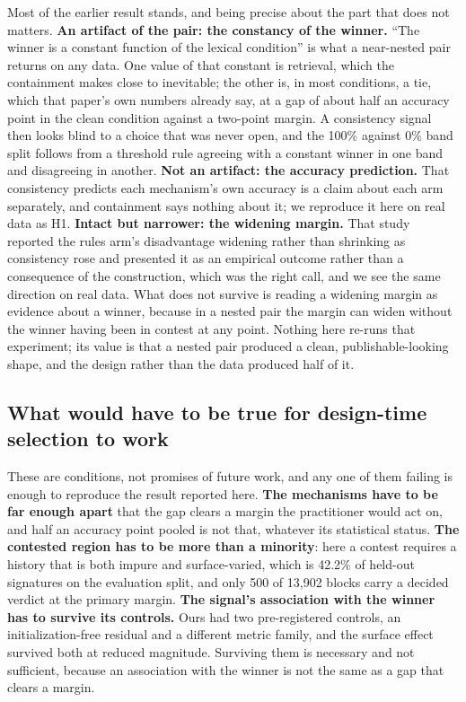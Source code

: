 \documentclass[11pt]{article}
\begin{document}
Most of the earlier result stands, and being precise about the part that does
not matters. \textbf{An artifact of the pair: the constancy of the winner.}
``The winner is a constant function of the lexical condition'' is what a
near-nested pair returns on any data. One value of that constant is
retrieval, which the containment makes close to inevitable; the other is, in
most conditions, a tie, which that paper's own numbers already say, at a gap of about half an
accuracy point in the clean condition against a two-point margin. A
consistency signal then looks blind to a choice that was never open, and the
100\% against 0\% band split follows from a threshold rule agreeing with a
constant winner in one band and disagreeing in another.
\textbf{Not an artifact: the accuracy prediction.} That consistency predicts
each mechanism's own accuracy is a claim about each arm separately, and
containment says nothing about it; we reproduce it here on real data as H1.
\textbf{Intact but narrower: the widening margin.} That study reported the
rules arm's disadvantage widening rather than shrinking as consistency rose
and presented it as an empirical outcome rather than a consequence of the
construction, which was the right call, and we see the same direction on real
data. What does not survive is reading a widening margin as evidence about a
winner, because in a nested pair the margin can widen without the winner
having been in contest at any point. Nothing here re-runs that experiment; its
value is that a nested pair produced a clean, publishable-looking shape, and
the design rather than the data produced half of it.

\subsection{What would have to be true for design-time selection to work}
\label{sec:conditions}

These are conditions, not promises of future work, and any one of them failing
is enough to reproduce the result reported here. \textbf{The mechanisms have
to be far enough apart} that the gap clears a margin the practitioner would
act on, and half an accuracy point pooled is not that, whatever its
statistical status. \textbf{The contested region has to be more than a
minority}: here a contest requires a history that is both impure and
surface-varied, which is 42.2\% of held-out signatures on the evaluation split,
and only 500 of 13{,}902 blocks carry a decided verdict at the primary margin.
\textbf{The signal's association with the winner has to survive its
controls.} Ours had two pre-registered controls, an initialization-free
residual and a different metric family, and the surface effect survived both
at reduced magnitude. Surviving them is necessary and not sufficient, because
an association with the winner is not the same as a gap that clears a margin.
\end{document}
